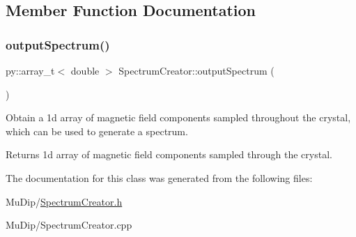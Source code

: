 \subsection{Member Function Documentation}
\mbox{\label{class_spectrum_creator_a0ca83ad1943d3a66182d18d096298ce0}} 
\subsubsection{\texorpdfstring{output\+Spectrum()}{outputSpectrum()}}
{\footnotesize\ttfamily py\+::array\+\_\+t$<$ double $>$ Spectrum\+Creator\+::output\+Spectrum (\begin{DoxyParamCaption}{ }\end{DoxyParamCaption})}

Obtain a 1d array of magnetic field components sampled throughout the crystal, which can be used to generate a spectrum. \begin{DoxyReturn}{Returns}
1d array of magnetic field components sampled through the crystal. 
\end{DoxyReturn}


The documentation for this class was generated from the following files\+:\begin{DoxyCompactItemize}
\item 
Mu\+Dip/\mbox{\hyperlink{_spectrum_creator_8h}{Spectrum\+Creator.\+h}}\item 
Mu\+Dip/Spectrum\+Creator.\+cpp\end{DoxyCompactItemize}
